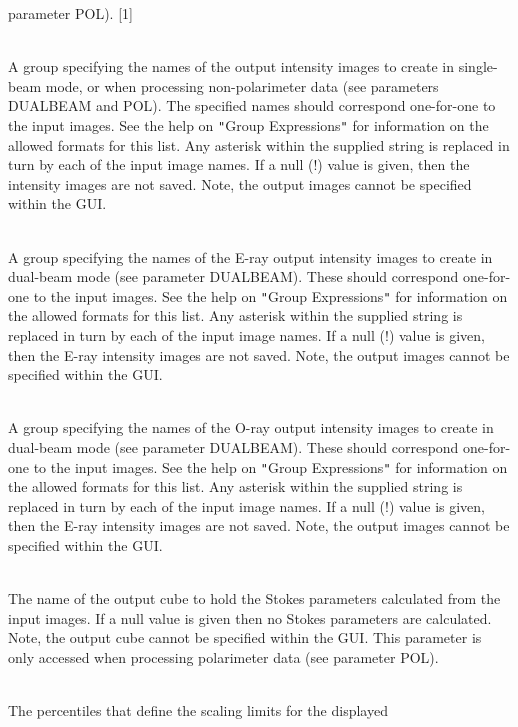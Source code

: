 \documentclass[twoside,11pt]{article}
\renewcommand{\_}{\texttt{\symbol{95}}}
\newcommand{\sstsubsection}[1]{ \item[{#1}] \mbox{} \\}
\newcommand{\sstsubsection}[1]{\item[{#1}]}
\begin{document}
{{{         parameter POL). [1]
      }
      \sstsubsection{
         OUT = LITERAL (Write)
      }{
         A group specifying the names of the output intensity images to
         create in single-beam mode, or when processing non-polarimeter
         data (see parameters DUALBEAM and POL). The specified names should
         correspond one-for-one to the input images. See the help on {\tt "}Group
         Expressions{\tt "} for information on the allowed formats for this list.
         Any asterisk within the supplied string is replaced in turn by
         each of the input image names. If a null (!) value is given, then
         the intensity images are not saved. Note, the output images cannot
         be specified within the GUI.
      }
      \sstsubsection{
         OUT\_E = LITERAL (Write)
      }{
         A group specifying the names of the E-ray output intensity images to
         create in dual-beam mode (see parameter DUALBEAM). These should
         correspond one-for-one to the input images. See the help on {\tt "}Group
         Expressions{\tt "} for information on the allowed formats for this list.
         Any asterisk within the supplied string is replaced in turn by
         each of the input image names. If a null (!) value is given, then
         the E-ray intensity images are not saved. Note, the output images
         cannot be specified within the GUI.
      }
      \sstsubsection{
         OUT\_O = LITERAL (Write)
      }{
         A group specifying the names of the O-ray output intensity images to
         create in dual-beam mode (see parameter DUALBEAM). These should
         correspond one-for-one to the input images. See the help on {\tt "}Group
         Expressions{\tt "} for information on the allowed formats for this list.
         Any asterisk within the supplied string is replaced in turn by
         each of the input image names. If a null (!) value is given, then
         the E-ray intensity images are not saved. Note, the output images
         cannot be specified within the GUI.
      }
      \sstsubsection{
         OUT\_S = NDF (Write)
      }{
         The name of the output cube to hold the Stokes parameters
         calculated from the input images. If a null value is given then
         no Stokes parameters are calculated. Note, the output cube
         cannot be specified within the GUI. This parameter is only
         accessed when processing polarimeter data (see parameter POL).
      }
      \sstsubsection{
         PERCENTILES( 2 ) = \_REAL (Update)
      }{
         The percentiles that define the scaling limits for the displayed
}}}
\end{document}
